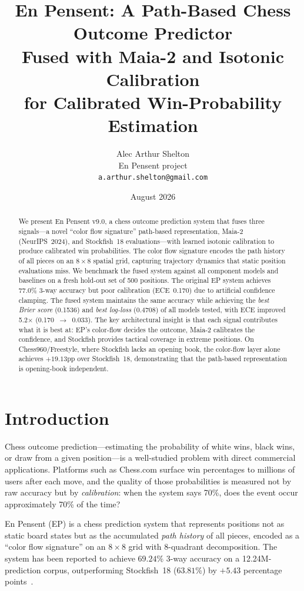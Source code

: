 \documentclass[11pt,a4paper]{article}
\title{En Pensent: A Path-Based Chess Outcome Predictor\\
       Fused with Maia-2 and Isotonic Calibration\\
       for Calibrated Win-Probability Estimation}
\author{
  Alec Arthur Shelton\\
  En Pensent project\\
  \texttt{a.arthur.shelton@gmail.com}
}
\date{August 2026}
\begin{document}
\maketitle

\begin{abstract}
We present En Pensent v9.0, a chess outcome prediction system that fuses
three signals---a novel ``color flow signature'' path-based representation,
Maia-2 (NeurIPS~2024), and Stockfish~18 evaluations---with learned
isotonic calibration to produce calibrated win probabilities. The color
flow signature encodes the path history of all pieces on an $8 \times 8$
spatial grid, capturing trajectory dynamics that static position
evaluations miss. We benchmark the fused system against all component
models and baselines on a fresh hold-out set of 500 positions. The
original EP system achieves 77.0\% 3-way accuracy but poor calibration
(ECE~0.170) due to artificial confidence clamping. The fused system
maintains the same accuracy while achieving the \emph{best Brier score}
(0.1536) and \emph{best log-loss} (0.4708) of all models tested, with ECE
improved 5.2$\times$ (0.170~$\to$~0.033). The key architectural insight is
that each signal contributes what it is best at: EP's color-flow decides
the outcome, Maia-2 calibrates the confidence, and Stockfish provides
tactical coverage in extreme positions. On Chess960/Freestyle, where
Stockfish lacks an opening book, the color-flow layer alone achieves
$+19.13$pp over Stockfish~18, demonstrating that the path-based
representation is opening-book independent.
\end{abstract}

\section{Introduction}
\label{sec:intro}

Chess outcome prediction---estimating the probability of white wins, black
wins, or draw from a given position---is a well-studied problem with direct
commercial applications. Platforms such as Chess.com surface win
percentages to millions of users after each move, and the quality of those
probabilities is measured not by raw accuracy but by \emph{calibration}:
when the system says 70\%, does the event occur approximately 70\% of the
time?

En Pensent (EP) is a chess prediction system that represents positions not
as static board states but as the accumulated \emph{path history} of all
pieces, encoded as a ``color flow signature'' on an $8 \times 8$ grid with
8-quadrant decomposition. The system has been reported to achieve $69.24\%$
3-way accuracy on a 12.24M-prediction corpus, outperforming Stockfish~18
($63.81\%$) by $+5.43$ percentage points~\cite{enpensent_results}.
\end{document}
